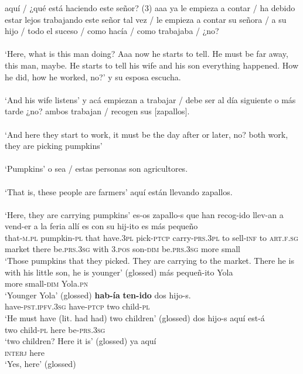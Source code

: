 \documentclass[output=paper]{langsci/langscibook}
\begin{document}
\ea \label{ex:gq13}
	\ea \label{ex:gq13a}
	\gll aquí / ¿qué está haciendo este señor? (3) aaa ya le empieza a contar / ha debido estar lejos trabajando este señor tal vez / le empieza a contar su señora / a su hijo / todo el suceso / como hacía / como trabajaba / ¿no?\\
	{}\\
	\glt ‘Here, what is this man doing? Aaa now he starts to tell. He must be far away, this man, maybe. He starts to tell his wife and his son everything happened. How he did, how he worked, no?’
	\ex \label{ex:gq13b}
	\gll y su esposa escucha.\\
	{}\\
 	\glt ‘And his wife listens’
	\ex \label{ex:gq13c}
	\gll y acá empiezan a trabajar / debe ser al día siguiente o más tarde ¿no? ambos trabajan / recogen sus [zapallos].\\
	{}\\
 	\glt ‘And here they start to work, it must be the day after or later, no? both work, they are picking pumpkins’ 
	\ex \label{ex:gq13d}
	\gll [zapallos]\\
	{}\\
	\glt ‘Pumpkins’ 
	\ex \label{ex:gq13e}
	\gll o sea / estas personas son agricultores.\\
	{}\\
	\glt ‘That is, these people are farmers’
	\ex \label{ex:gq13f}
	\gll  aquí están llevando zapallos.\\
	{}\\
	\glt ‘Here, they are carrying pumpkins’
	\ex \label{ex:gq13g}
	\gll  es-os zapallo-s que han recog-ido llev-an a vend-er a la feria allí es con su hij-ito es más pequeño\\
	that-\textsc{m.pl} pumpkin-\textsc{pl} that have.\textsc{3pl} pick-\textsc{ptcp} carry-\textsc{prs.3pl} to sell-\textsc{inf} to \textsc{art.f.sg} market there be.\textsc{prs.3sg} with \textsc{3.pos} son-\textsc{dim} be.\textsc{prs.3sg} more small\\
	\glt ‘Those pumpkins that they picked. They are carrying to the market. There he is with his little son, he is younger’ (glossed)
	\ex \label{ex:gq13h}
	\gll más pequeñ-ito Yola\\
	more small-\textsc{dim} Yola.\textsc{pn}\\
	\glt ‘Younger Yola’ (glossed)
	\ex \label{ex:gq13i}
	\gll \textbf{hab-ía} \textbf{ten-ido} dos hijo-s.\\ 
	have-\textsc{pst.ipfv.3sg} have-\textsc{ptcp} two child-\textsc{pl}\\
	\glt ‘He must have (lit. had had) two children’ (glossed)
	\ex \label{ex:gq13j}
	\gll dos hijo-s aquí est-á\\
	two child-\textsc{pl} here be-\textsc{prs.3sg}\\
	\glt ‘two children? Here it is’ (glossed)
	\ex \label{ex:gq13k}
	\gll ya aquí\\
	\textsc{interj} here\\
	\glt ‘Yes, here’ (glossed)
	\z
\z
\end{document}
